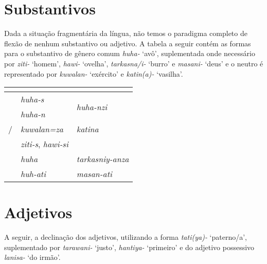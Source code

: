 \section{Substantivos}

Dada a situação fragmentária da língua, não temos o paradigma
completo de flexão de nenhum substantivo ou adjetivo. A tabela a seguir contém
as formas para o substantivo de gênero comum \emph{huha-} `avô', suplementada
onde necessário por \emph{ziti-} `homem', \emph{hawi-} `ovelha', \emph{tarkasna\slash{}i-}
`burro' e \emph{masani-} `deus' e o neutro é representado por \emph{kuwalan-}
`exército' e \emph{katin{(a)}-} `vasilha'.


\begin{center}
	\begin{tabular}[c]{lll}
		\toprule
		                      & \Sg{}\emph{}                  & \Pl{}\emph{}                       \\
		\midrule
		\Nom{} \Com{}         & \emph{huha-s}                 & \multirow{2}{4em}{\emph{huha-nzi}} \\
		\Acu{} \Com{}         & \emph{huha-n}                 &                                    \\
		\Nom{}/\Acu{} \Neut{} & \emph{kuwalan=za}             & \emph{katina}                      \\
		\Gen{}                & \emph{ziti-s}, \emph{hawi-si} &                                    \\
		\Dat{}                & \emph{huha}                   & \emph{tarkasniy-anza}              \\
		\Abl{}                & \emph{huh-ati}                & \emph{masan-ati}                   \\
		\bottomrule
	\end{tabular}
\end{center}


\section{Adjetivos}
A seguir, a declinação dos adjetivos, utilizando a forma \emph{tati{(ya)}-}
`paterno\slash{}a', suplementado por \emph{tarawani-} `justo',
\emph{hanti{ya}-} `primeiro' e do adjetivo possessivo \emph{lanisa-} `do irmão'.


